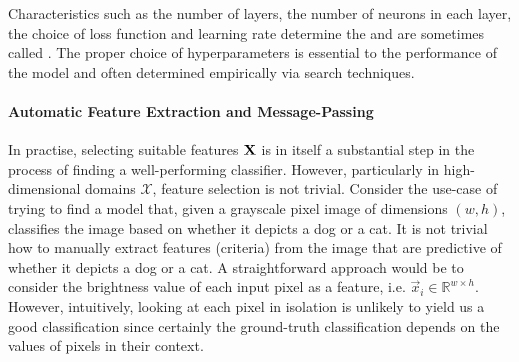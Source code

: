 \documentclass[
	fontsize=10pt, %
	twoside=false, %
	secnumdepth=1, %
]{kaobook}
\begin{document}
Characteristics such as the number of layers, the number of neurons in each
layer, the choice of loss function and learning rate determine the  and are sometimes called . The proper
choice of hyperparameters is essential to the performance of the model and often
determined empirically via search techniques.

\paragraph{Automatic Feature Extraction and Message-Passing}
In practise, selecting suitable features $\mathbf{X}$ is in itself a substantial
step in the process of finding a well-performing classifier. However,
particularly in high-dimensional domains $\mathcal{X}$, feature selection is not
trivial. Consider the use-case of trying to find a model that, given a grayscale
pixel image of dimensions $(w, h)$, classifies the image based on whether it depicts a
dog or a cat. It is not trivial how to manually extract features (criteria) from
the image that are predictive of whether it depicts a dog or a cat. A
straightforward approach would be to consider the brightness value of each input
pixel as a feature, i.e. $\vec x_i \in \mathbb{R}^{w \times h}$. However,
intuitively, looking at each pixel in isolation is unlikely to yield us a good
classification since certainly the ground-truth classification depends on the
values of pixels in their context.

\end{document}
